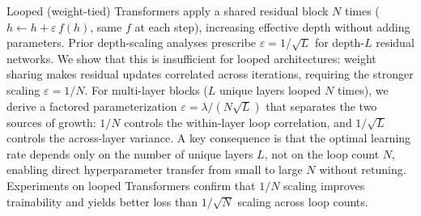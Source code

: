 Looped (weight-tied) Transformers apply a shared residual block $N$ times ($h \leftarrow h + \varepsilon\,f(h)$, same $f$ at each step), increasing effective depth without adding parameters.
Prior depth-scaling analyses prescribe $\varepsilon = 1/\!\sqrt{L}$ for depth-$L$ residual networks.
We show that this is insufficient for looped architectures: weight sharing makes residual updates correlated across iterations, requiring the stronger scaling $\varepsilon = 1/N$.
For multi-layer blocks ($L$ unique layers looped $N$ times), we derive a factored parameterization $\varepsilon = \lambda/(N\!\sqrt{L})$ that separates the two sources of growth: $1/N$ controls the within-layer loop correlation, and $1/\!\sqrt{L}$ controls the across-layer variance.
A key consequence is that the optimal learning rate depends only on the number of unique layers $L$, not on the loop count $N$, enabling direct hyperparameter transfer from small to large $N$ without retuning.
Experiments on looped Transformers confirm that $1/N$ scaling improves trainability and yields better loss than $1/\!\sqrt{N}$ scaling across loop counts.

